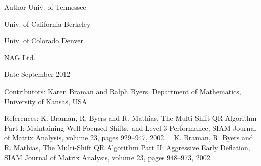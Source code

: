 \begin{DoxyAuthor}{Author}
Univ. of Tennessee 

Univ. of California Berkeley 

Univ. of Colorado Denver 

N\+A\+G Ltd. 
\end{DoxyAuthor}
\begin{DoxyDate}{Date}
September 2012 
\end{DoxyDate}
\begin{DoxyParagraph}{Contributors\+: }
Karen Braman and Ralph Byers, Department of Mathematics, University of Kansas, U\+S\+A 
\end{DoxyParagraph}
\begin{DoxyParagraph}{References\+: }
K. Braman, R. Byers and R. Mathias, The Multi-\/\+Shift Q\+R Algorithm Part I\+: Maintaining Well Focused Shifts, and Level 3 Performance, S\+I\+A\+M Journal of \hyperlink{classMatrix}{Matrix} Analysis, volume 23, pages 929--947, 2002. ~\newline
 K. Braman, R. Byers and R. Mathias, The Multi-\/\+Shift Q\+R Algorithm Part I\+I\+: Aggressive Early Deflation, S\+I\+A\+M Journal of \hyperlink{classMatrix}{Matrix} Analysis, volume 23, pages 948--973, 2002. 
\end{DoxyParagraph}
